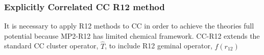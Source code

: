     \subsubsection{Explicitly Correlated CC R12 method}
      It is necessary to apply R12 methods to CC in order to achieve the theories full potential because MP2-R12 has limited chemical framework\cite{kong 2012}.  CC-R12 extends the standard CC cluster operator, $\hat{T}$, to include R12 geminal operator, $f(r_{12})$\cite{Noga 1992, Noga 1994}